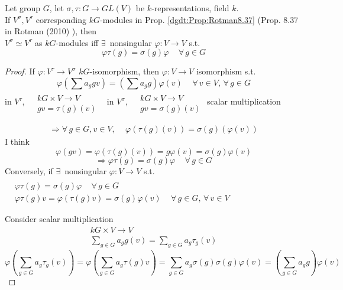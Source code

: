 \begin{proposition}
	Let group $G$, let $\sigma, \tau: G \to GL(V)$ be $k$-representations, field $k$.  \\
	If $V^{\sigma}, V^{\tau}$ corresponding $kG$-modules in Prop. \ref{dgdt:Prop:Rotman8.37} (Prop. 8.37 in Rotman (2010) \cite{dgdt:JRotman2010}), then \\
	$V^{\sigma} \simeq V^{\tau}$ as $kG$-modules iff $\exists \, $ nonsingular $\varphi :V \to V$ s.t. 
	\[
	\varphi \tau(g) = \sigma(g) \varphi \quad \, \forall \, g \in G
	\]
	
\end{proposition}

\begin{proof}
	If $\varphi : V^{\tau} \to V^{\sigma}$ $kG$-isomorphism, then $\varphi : V \to V$ isomorphism s.t.
	\[
	\varphi( \sum a_g g v ) = (\sum a_g g)\varphi(v) \quad \, \forall \, v \in V, \, \forall \, g \in G
	\]
	in $V^{\tau}$, $\begin{aligned} & \quad \\
	& kG \times V \to V \\
	& gv = \tau(g)(v) \end{aligned}$ \quad \quad \, in $V^{\sigma}$, $\begin{aligned} & \quad \\
	& kG \times V \to V \\
	& gv = \sigma(g)(v) \end{aligned}$ scalar multiplication
	
	\[
	\begin{gathered}
	\Longrightarrow \forall \, g \in G, v\in V, \quad \, \varphi(\tau(g)(v)) = \sigma(g)(\varphi(v))
	\end{gathered}
	\]
	I think 
	\[
	\varphi(gv) = \varphi(\tau(g)(v)) = g\varphi(v) = \sigma(g)\varphi(v)
	\]
	\[
	\Longrightarrow \varphi \tau(g) = \sigma(g) \varphi \quad \, \forall \, g \in G
	\]
	Conversely, if $\exists \, $ nonsingular $\varphi : V \to V$ s.t. $\begin{aligned} & \quad \\ 
	& \varphi \tau (g) = \sigma(g) \varphi \quad \, \forall \, g \in G \\
	& \varphi \tau(g) v = \varphi(\tau(g)v) = \sigma(g)\varphi(v) \quad \, \forall \, g \in G, \, \forall \, v \in V \end{aligned}$
	
	Consider scalar multiplication
	\[
	\begin{gathered}
	kG \times V \to V \\ 
	\sum_{g\in G} a_g g(v) = \sum_{g\in G} a_g \tau_g(v)
	\end{gathered}
	\]
	\[
	\varphi \left( \sum_{g\in G} a_g \tau_g(v) \right) = \varphi \left( \sum_{g\in G} a_g \tau(g) v\right) = \sum_{g\in G} a_g \sigma(g) \sigma(g)\varphi(v) = \left( \sum_{g\in G} a_g g \right) \varphi(v)
	\]
	
\end{proof}

